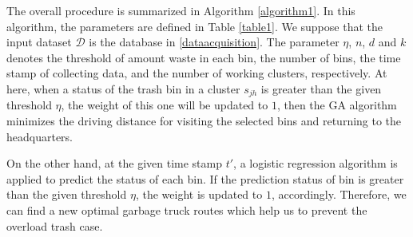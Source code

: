 \documentclass[conference,compsoc]{IEEEtran}
\begin{document}
\par  The overall procedure is summarized in Algorithm \ref{algorithm1}. In this algorithm, the parameters are defined in Table \ref{table1}. We suppose that the input dataset $\mathcal{D}$ is the database in \ref{dataacquisition}. The parameter $\eta$, $n$, $d$ and $k$ denotes the threshold of amount waste in each bin, the number of bins, the time stamp of collecting data, and the number of working clusters, respectively.
At here, when a status of the trash bin in a cluster $s_{jh}$ is greater than the given threshold $\eta$, the weight of this one will be updated to $1$, then the GA algorithm minimizes the driving distance for visiting the selected bins and returning to the headquarters. 
\par On the other hand, at the given time stamp $t'$, a logistic regression algorithm is applied to predict the status of each bin. If the prediction status of bin is greater than the given threshold $\eta$, the weight is updated to $1$, accordingly. Therefore, we can find a new optimal garbage truck routes which help us to prevent the overload trash case.
\end{document}
